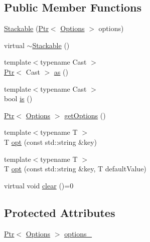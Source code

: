 \subsection*{Public Member Functions}
\begin{DoxyCompactItemize}
\item 
\hyperlink{classmarian_1_1rnn_1_1Stackable_a0aded6af5da3482e4e16bdb54d00c4b3}{Stackable} (\hyperlink{namespacemarian_ad1a373be43a00ef9ce35666145137b08}{Ptr}$<$ \hyperlink{classmarian_1_1Options}{Options} $>$ options)
\item 
virtual \hyperlink{classmarian_1_1rnn_1_1Stackable_a4b3546406036bcb8706c477b48d92da4}{$\sim$\+Stackable} ()
\item 
{\footnotesize template$<$typename Cast $>$ }\\\hyperlink{namespacemarian_ad1a373be43a00ef9ce35666145137b08}{Ptr}$<$ Cast $>$ \hyperlink{classmarian_1_1rnn_1_1Stackable_a33df0f892797bb7ebe12f3c0f18b43ce}{as} ()
\item 
{\footnotesize template$<$typename Cast $>$ }\\bool \hyperlink{classmarian_1_1rnn_1_1Stackable_ad4f5316be17590c467cd8c28b67279b3}{is} ()
\item 
\hyperlink{namespacemarian_ad1a373be43a00ef9ce35666145137b08}{Ptr}$<$ \hyperlink{classmarian_1_1Options}{Options} $>$ \hyperlink{classmarian_1_1rnn_1_1Stackable_a7504c0066b552a5d31b81334d6b488e5}{get\+Options} ()
\item 
{\footnotesize template$<$typename T $>$ }\\T \hyperlink{classmarian_1_1rnn_1_1Stackable_a48fdd87d8af9edf44eec0a2dbde06b2c}{opt} (const std\+::string \&key)
\item 
{\footnotesize template$<$typename T $>$ }\\T \hyperlink{classmarian_1_1rnn_1_1Stackable_a0e6bde0a208b299d6da5c305858c0569}{opt} (const std\+::string \&key, T default\+Value)
\item 
virtual void \hyperlink{classmarian_1_1rnn_1_1Stackable_a322f402f6edc55cee4d1368df35bae8b}{clear} ()=0
\end{DoxyCompactItemize}
\subsection*{Protected Attributes}
\begin{DoxyCompactItemize}
\item 
\hyperlink{namespacemarian_ad1a373be43a00ef9ce35666145137b08}{Ptr}$<$ \hyperlink{classmarian_1_1Options}{Options} $>$ \hyperlink{classmarian_1_1rnn_1_1Stackable_a8d4661b0e78935359f7a1bb764f44dec}{options\+\_\+}
\end{DoxyCompactItemize}


